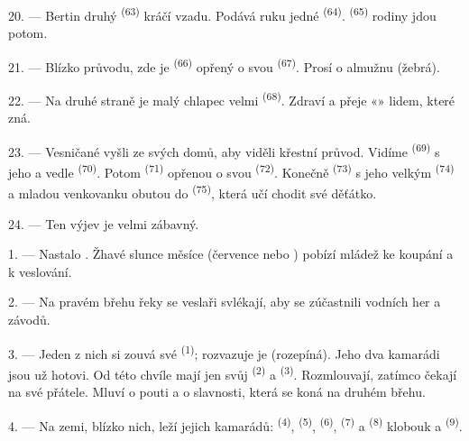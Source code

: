 20. --- Bertin druhý  \textsuperscript{(63)} kráčí vzadu. Podává ruku
jedné  \textsuperscript{(64)}. 
\textsuperscript{(65)} rodiny jdou potom.

\VUsaut{4.6mm}
\VUsaut{3.4mm}

21. --- Blízko průvodu, zde je  \textsuperscript{(66)} opřený o svou
 \textsuperscript{(67)}. Prosí o almužnu (žebrá).

22. --- Na druhé straně je malý chlapec velmi 
\textsuperscript{(68)}. Zdraví a přeje «» lidem, které zná.

23. --- Vesničané vyšli ze svých domů, aby viděli křestní průvod. Vidíme
 \textsuperscript{(69)} s jeho  a vedle
 \textsuperscript{(70)}. Potom 
\textsuperscript{(71)} opřenou o svou  \textsuperscript{(72)}. Konečně
 \textsuperscript{(73)} s jeho velkým 
\textsuperscript{(74)} a mladou venkovanku obutou do 
\textsuperscript{(75)}, která učí chodit své děťátko.

24. --- Ten výjev je velmi zábavný.

\VUsaut{4.0mm}
\VUsaut{3.0mm}

\VUsaut{2.4mm}

\VUsaut{3.0mm}

1. --- Nastalo . Žhavé slunce měsíce  (července nebo
) pobízí mládež ke koupání a k veslování.

2. --- Na pravém břehu řeky se veslaři svlékají, aby se zúčastnili vodních her a
závodů.

3. --- Jeden z nich si zouvá své  \textsuperscript{(1)}; rozvazuje je
(rozepíná). Jeho dva kamarádi jsou už hotovi. Od této chvíle mají jen svůj
 \textsuperscript{(2)} a  \textsuperscript{(3)}.
Rozmlouvají, zatímco čekají na své přátele. Mluví o pouti a o slavnosti, která se koná
na druhém břehu.

4. --- Na zemi, blízko nich, leží  jejich kamarádů: 
 \textsuperscript{(4)},  \textsuperscript{(5)},
 \textsuperscript{(6)},  \textsuperscript{(7)} a
 \textsuperscript{(8)} klobouk a 
\textsuperscript{(9)}.

